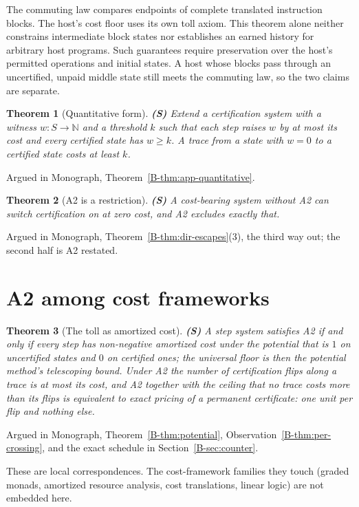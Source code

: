 \documentclass[11pt, a4paper]{report}
\theoremstyle{definition}
\theoremstyle{plain}
\newtheorem{theorem}{Theorem}[chapter]
\newcommand{\N}{\mathbb{N}}
\begin{document}
The commuting law compares endpoints of complete translated instruction blocks.
The host's cost floor uses its own toll axiom. This theorem alone neither constrains
intermediate block states nor establishes an earned history for arbitrary host
programs. Such guarantees require preservation over the host's permitted operations
and initial states. A host whose blocks pass through an uncertified, unpaid middle state still meets the commuting law,
so the two claims are separate.

\begin{theorem}[Quantitative form] \textbf{(S)}
Extend a certification system with a witness $w : S \to \N$ and a threshold $k$ such that each step raises $w$ by at most its cost and every certified state has $w \ge k$. A trace from a state with $w = 0$ to a certified state costs at least $k$.
\end{theorem}
\noindent Argued in Monograph, Theorem~\ref{B-thm:app-quantitative}.

\begin{theorem}[A2 is a restriction] \textbf{(S)}
A cost-bearing system without A2 can switch certification on at zero cost, and A2 excludes exactly that.
\end{theorem}
\noindent Argued in Monograph, Theorem~\ref{B-thm:dir-escapes}(3), the third way out; the second half is A2 restated.

\section{A2 among cost frameworks}

\begin{theorem}[The toll as amortized cost] \textbf{(S)}
A step system satisfies A2 if and only if every step has non-negative amortized cost under the potential that is $1$ on uncertified states and $0$ on certified ones; the universal floor is then the potential method's telescoping bound.
Under A2 the number of certification flips along a trace is at most its cost, and A2 together with the ceiling that no trace costs more than its flips is equivalent to exact pricing of a permanent certificate: one unit per flip and nothing else.
\end{theorem}
\noindent Argued in Monograph, Theorem~\ref{B-thm:potential}, Observation~\ref{B-thm:per-crossing}, and the exact schedule in Section~\ref{B-sec:counter}.

These are local correspondences. The cost-framework families they touch (graded monads, amortized resource analysis, cost translations, linear logic) are not embedded here.
\end{document}

